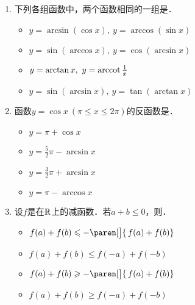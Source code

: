 \documentclass[a4paper,punct=CCT]{ctexbook}
\theoremstyle{definition}
\theoremstyle{remark}
\newif\ifshowsol
\let\leq\leqslant
\let\le\leq
\let\geq\geqslant
\let\ge\geq}
\begin{document}
\begin{enumerate}
\item 下列各组函数中，两个函数相同的一组是\uline{\makebox[6em]{}}．
  \begin{itemize}
    \renewcommand{\labelitemi}{\faCircleThin}
  \item \(y = \arcsin(\cos x),\ y = \arccos(\sin x)\)
    \ifshowsol
  \item[\faCircle] \(y = \sin(\arccos x),\ y = \cos(\arcsin x)\)
    \else
  \item \(y = \sin(\arccos x),\ y = \cos(\arcsin x)\)
    \fi
  \item \(y = \arctan x,\ y = \operatorname{arccot}\frac1x\)
  \item \(y = \sin(\arcsin x),\ y = \tan(\arctan x)\)
  \end{itemize}

  \ifshowsol
  选项~C和~D中的函数都是因为定义域的不同而导致函数不同的．
  \fi

\item 函数\(y = \cos x\ (\pi \le x \le 2\pi)\)的反函数是\uline{\makebox[6em]{}}．
  \begin{itemize}
    \renewcommand{\labelitemi}{\faCircleThin}
  \item \(y = \pi + \cos x\)
  \item \(y = \frac52\pi - \arcsin x\)
    \ifshowsol
  \item[\faCircle] \(y = \frac32\pi + \arcsin x\)
    \else
  \item \(y = \frac32\pi + \arcsin x\)
    \fi
  \item \(y = \pi - \arccos x\)
  \end{itemize}

\item 设\(f\)是在\(\mathbb{R}\)上的减函数．若\(a + b \le 0\)，则\uline{\makebox[6em]{}}．
  \begin{itemize}
    \renewcommand{\labelitemi}{\faCircleThin}
  \item \(f(a) + f(b) \le -\paren[\big]{\,f(a) + f(b)}\)
  \item \(f(a) + f(b) \le f(-a) + f(-b)\)
  \item \(f(a) + f(b) \ge -\paren[\big]{\,f(a) + f(b)}\)
    \ifshowsol
  \item[\faCircle] \(f(a) + f(b) \ge f(-a) + f(-b)\)
    \else
  \item \(f(a) + f(b) \ge f(-a) + f(-b)\)
    \fi
  \end{itemize}

  \ifshowsol
  选项~A和~C都可以通过举反例来证伪，比方说\(f(x) = \arccot x\)证伪了~A，\(f(x) = -\pi + \arccot x\)证伪了~C．对于~B和~D，可以根据\(a + b \le 0\)的性质来说明．两个数的和非正，这就说明至少其中有一个数非正．当另外一个数也是非正的时候，易证~D成立．当另外一个数是正数的时候，不失一般地，不妨假设\(a \le 0 < b\)，那么有\(a \le -b < 0 < b \le -a\)．所以有
  \[
    f(a) \ge f(-b) > f(b) \ge f(-a).
  \]
  因此~D成立．
  \fi


\end{enumerate}
\end{document}
